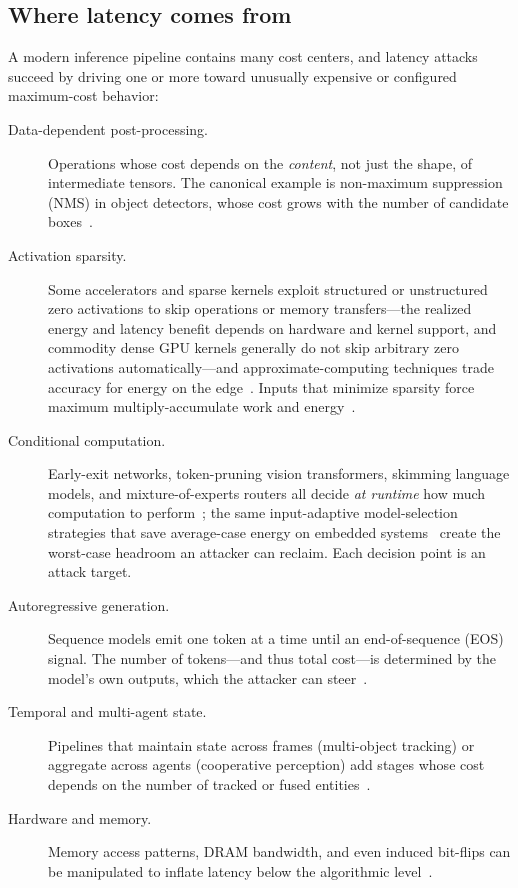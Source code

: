 \documentclass[acmsmall,screen,review,nonacm]{acmart}
\begin{document}
\subsection{Where latency comes from}
A modern inference pipeline contains many cost centers, and latency attacks succeed by driving one or more toward unusually expensive or configured maximum-cost behavior:
\begin{description}
  \item[Data-dependent post-processing.] Operations whose cost depends on the \emph{content}, not just the shape, of intermediate tensors. The canonical example is non-maximum suppression (NMS) in object detectors, whose cost grows with the number of candidate boxes~\cite{shapira2023phantom}.
  \item[Activation sparsity.] Some accelerators and sparse kernels exploit structured or unstructured zero activations to skip operations or memory transfers---the realized energy and latency benefit depends on hardware and kernel support, and commodity dense GPU kernels generally do not skip arbitrary zero activations automatically---and approximate-computing techniques trade accuracy for energy on the edge~\cite{ghosh2023approxedge}. Inputs that minimize sparsity force maximum multiply-accumulate work and energy~\cite{shumailov2021sponge,muller2024uniform}.
  \item[Conditional computation.] Early-exit networks, token-pruning vision transformers, skimming language models, and mixture-of-experts routers all decide \emph{at runtime} how much computation to perform~\cite{teerapittayanon2016branchynet,rao2021dynamicvit,fedus2022switch}; the same input-adaptive model-selection strategies that save average-case energy on embedded systems~\cite{marco2020adaptive} create the worst-case headroom an attacker can reclaim. Each decision point is an attack target.
  \item[Autoregressive generation.] Sequence models emit one token at a time until an end-of-sequence (EOS) signal. The number of tokens---and thus total cost---is determined by the model's own outputs, which the attacker can steer~\cite{chen2022nmtsloth,gao2024verbose}.
  \item[Temporal and multi-agent state.] Pipelines that maintain state across frames (multi-object tracking) or aggregate across agents (cooperative perception) add stages whose cost depends on the number of tracked or fused entities~\cite{jia2020fooling,wang2026cpfreezer}.
  \item[Hardware and memory.] Memory access patterns, DRAM bandwidth, and even induced bit-flips can be manipulated to inflate latency below the algorithmic level~\cite{sistla2025bitflip,nakai2021timing}.
\end{description}
\end{document}

